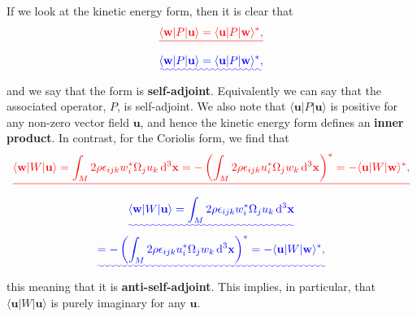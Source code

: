 \documentclass[a4paper,12pt]{paper}
\providecommand{\DIFadd}[1]{{\protect\color{blue}\uwave{#1}}} %
\providecommand{\DIFdel}[1]{{\protect\color{red}\sout{#1}}}                      %
\providecommand{\DIFaddbegin}{} %
\providecommand{\DIFaddend}{} %
\providecommand{\DIFdelbegin}{} %
\providecommand{\DIFdelend}{} %
\begin{document}
If we look at the kinetic energy form, then it is clear that
\DIFdelbegin \begin{displaymath}
\DIFdel{\langle \mathbf{w}|P|\mathbf{u}\rangle=\langle \mathbf{u}|P|\mathbf{w}\rangle^{*},
}\end{displaymath}%
\DIFdelend \DIFaddbegin \begin{equation}
\DIFadd{\langle \mathbf{w}|P|\mathbf{u}\rangle=\langle \mathbf{u}|P|\mathbf{w}\rangle^{*},
\label{eq:13}
}\end{equation}\DIFaddend 
and we say that the form is \textbf{self-adjoint}. Equivalently we can say that the associated operator, $P$, is self-adjoint. 
We also note that $\langle \mathbf{u}|P|\mathbf{u}\rangle$ is positive for any non-zero vector field $\mathbf{u}$,
 and hence the kinetic energy form defines an \textbf{inner product}. In contrast, for the Coriolis form, we find that
\DIFdelbegin \begin{displaymath}
\DIFdel{\langle \mathbf{w}|W|\mathbf{u}\rangle=\int_{M}2\rho\epsilon_{ijk}w_{i}^{*}\Omega_{j}u_{k}\dd^{3}\mathbf{x} =
 -\left(\int_{M}2\rho\epsilon_{ijk}u_{i}^{*}\Omega_{j}w_{k}\dd^{3}\mathbf{x}\right)^{*} = -\langle \mathbf{u}|W|\mathbf{w}\rangle^{*},
}\end{displaymath}%
\DIFdelend \DIFaddbegin \begin{multline}
\DIFadd{\langle \mathbf{w}|W|\mathbf{u}\rangle=\int_{M}2\rho\epsilon_{ijk}w_{i}^{*}\Omega_{j}u_{k}\dd^{3}\mathbf{x} }\\
 \DIFadd{= -\left(\int_{M}2\rho\epsilon_{ijk}u_{i}^{*}\Omega_{j}w_{k}\dd^{3}\mathbf{x}\right)^{*} = -\langle \mathbf{u}|W|\mathbf{w}\rangle^{*},
\label{eq:14}
}\end{multline}\DIFaddend 
this meaning that it is \textbf{anti-self-adjoint}. This implies, in particular, that $\langle \mathbf{u}|W|\mathbf{u}\rangle$ is
 purely imaginary for any $\mathbf{u}$.
\end{document}
